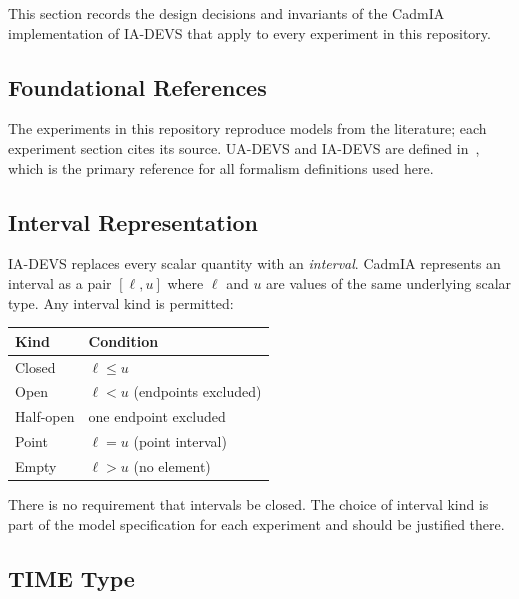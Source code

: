 This section records the design decisions and invariants of the CadmIA
implementation of IA-DEVS that apply to every experiment in this repository.

\subsection*{Foundational References}

The experiments in this repository reproduce models from the literature;
each experiment section cites its source.  UA-DEVS and IA-DEVS are
defined in~\cite{VDW21}, which is the primary reference for all formalism
definitions used here.

\subsection*{Interval Representation}

IA-DEVS replaces every scalar quantity with an \emph{interval}.  CadmIA
represents an interval as a pair $[\ell, u]$ where $\ell$ and $u$ are values
of the same underlying scalar type.  Any interval kind is permitted:

\begin{center}
\begin{tabular}{@{}ll@{}}
  \toprule
  Kind & Condition \\
  \midrule
  Closed         & $\ell \leq u$                         \\
  Open           & $\ell < u$ (endpoints excluded)       \\
  Half-open      & one endpoint excluded                 \\
  Point          & $\ell = u$ (point interval)           \\
  Empty          & $\ell > u$ (no element)               \\
  \bottomrule
\end{tabular}
\end{center}

There is no requirement that intervals be closed.  The choice of interval kind
is part of the model specification for each experiment and should be justified
there.

\subsection*{TIME Type}

